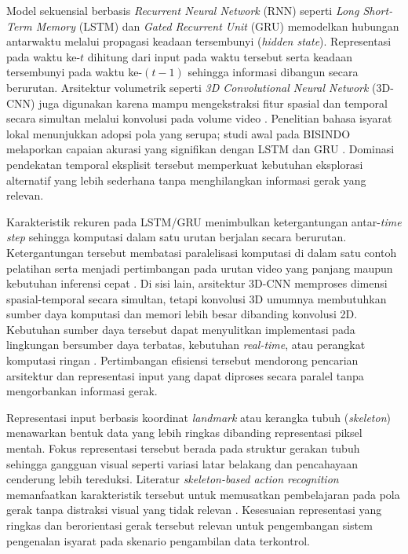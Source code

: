 Model sekuensial berbasis \textit{Recurrent Neural Network} (RNN) seperti \textit{Long Short-Term Memory} (LSTM) dan \textit{Gated Recurrent Unit} (GRU) memodelkan hubungan antarwaktu melalui propagasi keadaan tersembunyi (\textit{hidden state}).
Representasi pada waktu ke-$t$ dihitung dari input pada waktu tersebut serta keadaan tersembunyi pada waktu ke-$(t-1)$ sehingga informasi dibangun secara berurutan.
Arsitektur volumetrik seperti \textit{3D Convolutional Neural Network} (3D-CNN) juga digunakan karena mampu mengekstraksi fitur spasial dan temporal secara simultan melalui konvolusi pada volume video \cite{anturkar2025lstm3dcnn}.
Penelitian bahasa isyarat lokal menunjukkan adopsi pola yang serupa; studi awal pada BISINDO melaporkan capaian akurasi yang signifikan dengan LSTM dan GRU \cite{maheswara2023lstmbisindo}.
Dominasi pendekatan temporal eksplisit tersebut memperkuat kebutuhan eksplorasi alternatif yang lebih sederhana tanpa menghilangkan informasi gerak yang relevan.

Karakteristik rekuren pada LSTM/GRU menimbulkan ketergantungan antar-\textit{time step} sehingga komputasi dalam satu urutan berjalan secara berurutan.
Ketergantungan tersebut membatasi paralelisasi komputasi di dalam satu contoh pelatihan serta menjadi pertimbangan pada urutan video yang panjang maupun kebutuhan inferensi cepat \cite{zhu2020comprehensivestudydeepvideo}.
Di sisi lain, arsitektur 3D-CNN memproses dimensi spasial-temporal secara simultan, tetapi konvolusi 3D umumnya membutuhkan sumber daya komputasi dan memori lebih besar dibanding konvolusi 2D.
Kebutuhan sumber daya tersebut dapat menyulitkan implementasi pada lingkungan bersumber daya terbatas, kebutuhan \textit{real-time}, atau perangkat komputasi ringan \cite{gu2021surveyhumanactivity}.
Pertimbangan efisiensi tersebut mendorong pencarian arsitektur dan representasi input yang dapat diproses secara paralel tanpa mengorbankan informasi gerak.

Representasi input berbasis koordinat \textit{landmark} atau kerangka tubuh (\textit{skeleton}) menawarkan bentuk data yang lebih ringkas dibanding representasi piksel mentah.
Fokus representasi tersebut berada pada struktur gerakan tubuh sehingga gangguan visual seperti variasi latar belakang dan pencahayaan cenderung lebih tereduksi.
Literatur \textit{skeleton-based action recognition} memanfaatkan karakteristik tersebut untuk memusatkan pembelajaran pada pola gerak tanpa distraksi visual yang tidak relevan \cite{duan2022skeleton}.
Kesesuaian representasi yang ringkas dan berorientasi gerak tersebut relevan untuk pengembangan sistem pengenalan isyarat pada skenario pengambilan data terkontrol.


